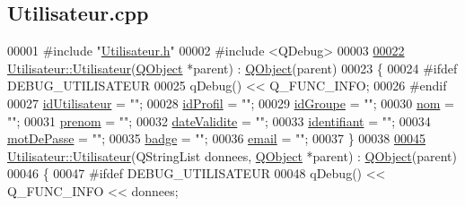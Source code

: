 \hypertarget{_utilisateur_8cpp_source}{}\subsection{Utilisateur.\+cpp}
\label{_utilisateur_8cpp_source}

\begin{DoxyCode}
00001 \textcolor{preprocessor}{#include "\hyperlink{_utilisateur_8h}{Utilisateur.h}"}
00002 \textcolor{preprocessor}{#include <QDebug>}
00003 
\hyperlink{class_utilisateur_a89e539739c5f6c6790909ac5fc5729b8}{00022} \hyperlink{class_utilisateur_a89e539739c5f6c6790909ac5fc5729b8}{Utilisateur::Utilisateur}(\hyperlink{class_q_object}{QObject} *parent) : 
      \hyperlink{class_q_object}{QObject}(parent)
00023 \{
00024 \textcolor{preprocessor}{    #ifdef DEBUG\_UTILISATEUR}
00025         qDebug() << Q\_FUNC\_INFO;
00026 \textcolor{preprocessor}{    #endif}
00027     \hyperlink{class_utilisateur_ae1763e7a52c82c63506bc4160cdabb20}{idUtilisateur} = \textcolor{stringliteral}{""};
00028     \hyperlink{class_utilisateur_a042947e8b86637d1eb012c3fc89a959e}{idProfil} = \textcolor{stringliteral}{""};
00029     \hyperlink{class_utilisateur_a13c3425772da1d5501e6fe4a2f2b8194}{idGroupe} = \textcolor{stringliteral}{""};
00030     \hyperlink{class_utilisateur_a1096e809aca4b7cf453a7af93cb72502}{nom} = \textcolor{stringliteral}{""};
00031     \hyperlink{class_utilisateur_a1dd0779807b19298f30f39d9c371170f}{prenom} = \textcolor{stringliteral}{""};
00032     \hyperlink{class_utilisateur_a898cd6f5a64d733ad49a8a74388326cd}{dateValidite} = \textcolor{stringliteral}{""};
00033     \hyperlink{class_utilisateur_a1e79e47202a2c716346f47adbbeb2511}{identifiant} = \textcolor{stringliteral}{""};
00034     \hyperlink{class_utilisateur_a4f6a17d0fb5c231bcb414396236a056f}{motDePasse} = \textcolor{stringliteral}{""};
00035     \hyperlink{class_utilisateur_a77b48aa9d1f0ec04c69d45476897fec6}{badge} = \textcolor{stringliteral}{""};
00036     \hyperlink{class_utilisateur_a2f45443ce5277a5e6baefe5121e66555}{email} = \textcolor{stringliteral}{""};
00037 \}
00038 
\hyperlink{class_utilisateur_a6bfd9ef83e910946f3cf3b6e0fcca343}{00045} \hyperlink{class_utilisateur_a89e539739c5f6c6790909ac5fc5729b8}{Utilisateur::Utilisateur}(QStringList donnees, \hyperlink{class_q_object}{QObject} *parent) : 
      \hyperlink{class_q_object}{QObject}(parent)
00046 \{
00047 \textcolor{preprocessor}{    #ifdef DEBUG\_UTILISATEUR}
00048         qDebug() << Q\_FUNC\_INFO << donnees;

\end{DoxyCode}
